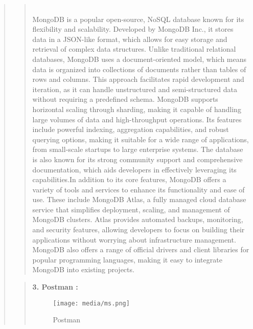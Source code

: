 \documentclass[12pt]{report}
\begin{document}
\begin{quote}
\begin{quote}
\begin{figure}[h]
			\end{figure}
			\\MongoDB is a popular open-source, NoSQL database known for its flexibility and scalability. Developed by MongoDB Inc., it stores data in a JSON-like format, which allows for easy storage and retrieval of complex data structures. Unlike traditional relational databases, MongoDB uses a document-oriented model, which means data is organized into collections of documents rather than tables of rows and columns. This approach facilitates rapid development and iteration, as it can handle unstructured and semi-structured data without requiring a predefined schema. MongoDB supports horizontal scaling through sharding, making it capable of handling large volumes of data and high-throughput operations. Its features include powerful indexing, aggregation capabilities, and robust querying options, making it suitable for a wide range of applications, from small-scale startups to large enterprise systems. The database is also known for its strong community support and comprehensive documentation, which aids developers in effectively leveraging its capabilities.In addition to its core features, MongoDB offers a variety of tools and services to enhance its functionality and ease of use. These include MongoDB Atlas, a fully managed cloud database service that simplifies deployment, scaling, and management of MongoDB clusters. Atlas provides automated backups, monitoring, and security features, allowing developers to focus on building their applications without worrying about infrastructure management. MongoDB also offers a range of official drivers and client libraries for popular programming languages, making it easy to integrate MongoDB into existing projects. 
		\end{quote}
		\clearpage
		
		\begin{quote}
			\textbf{3. Postman :}
			\begin{figure}[h]
				\centering
				\texttt{[image: media/ms.png]}\\
				\caption{Postman}
				

\end{figure}
\end{quote}
\end{quote}
\end{document}

